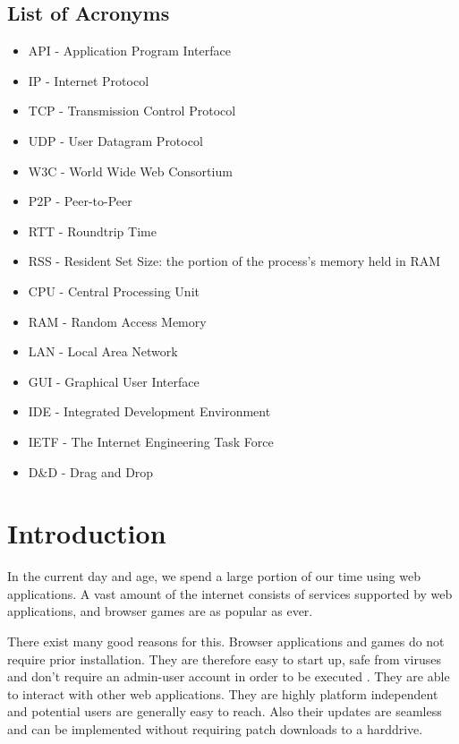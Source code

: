 \documentclass[bsc,frontabs,twoside,singlespacing,parskip,deptreport]{infthesis}     %
\begin{document}
\section*{List of Acronyms}
\begin{itemize}
\item API - Application Program Interface
\item IP - Internet Protocol
\item TCP - Transmission Control Protocol
\item UDP - User Datagram Protocol
\item W3C - World Wide Web Consortium
\item P2P - Peer-to-Peer
\item RTT - Roundtrip Time
\item RSS - Resident Set Size: the portion of the process's memory held in RAM
\item CPU - Central Processing Unit
\item RAM - Random Access Memory
\item LAN - Local Area Network
\item GUI - Graphical User Interface
\item IDE - Integrated Development Environment
\item IETF - The Internet Engineering Task Force
\item D\&D - Drag and Drop
\end{itemize}

\tableofcontents




\chapter{Introduction}
In the current day and age, we spend a large portion of our time using web applications. A vast amount of the internet consists of services supported by web applications, and browser games are as popular as ever.

There exist many good reasons for this. Browser applications and games do not require prior installation. They are therefore easy to start up, safe from viruses and don't require an admin-user account in order to be executed \cite{Web_Apps_Superior}. They are able to interact with other web applications. They are highly platform independent and potential users are generally easy to reach. Also their updates are seamless and can be implemented without requiring patch downloads to a harddrive.
\end{document}
